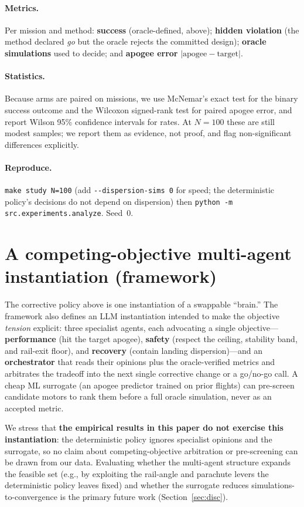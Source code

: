 \documentclass[11pt]{article}
\begin{document}
\paragraph{Metrics.} Per mission and method: \textbf{success} (oracle-defined,
above); \textbf{hidden violation} (the method declared \emph{go} but the oracle
rejects the committed design); \textbf{oracle simulations} used to decide; and
\textbf{apogee error} $|\text{apogee} - \text{target}|$.

\paragraph{Statistics.} Because arms are paired on missions, we use McNemar's
exact test for the binary success outcome and the Wilcoxon signed-rank test for
paired apogee error, and report Wilson 95\% confidence intervals for rates. At
$N = 100$ these are still modest samples; we report them as evidence, not proof,
and flag non-significant differences explicitly.

\paragraph{Reproduce.} \texttt{make study N=100} (add \texttt{-{}-dispersion-sims 0}
for speed; the deterministic policy's decisions do not depend on dispersion) then
\texttt{python -m src.experiments.analyze}. Seed~0.

\section{A competing-objective multi-agent instantiation (framework)}
\label{sec:framework}

The corrective policy above is one instantiation of a swappable ``brain.'' The
framework also defines an LLM instantiation intended to make the objective
\emph{tension} explicit: three specialist agents, each advocating a single
objective---\textbf{performance} (hit the target apogee), \textbf{safety}
(respect the ceiling, stability band, and rail-exit floor), and
\textbf{recovery} (contain landing dispersion)---and an \textbf{orchestrator}
that reads their opinions plus the oracle-verified metrics and arbitrates the
tradeoff into the next single corrective change or a go/no-go call. A cheap ML
surrogate (an apogee predictor trained on prior flights) can pre-screen candidate
motors to rank them before a full oracle simulation, never as an accepted metric.

We stress that \textbf{the empirical results in this paper do not exercise this
instantiation}: the deterministic policy ignores specialist opinions and the
surrogate, so no claim about competing-objective arbitration or pre-screening can
be drawn from our data. Evaluating whether the multi-agent structure expands the
feasible set (e.g., by exploiting the rail-angle and parachute levers the
deterministic policy leaves fixed) and whether the surrogate reduces
simulations-to-convergence is the primary future work (Section~\ref{sec:disc}).
\end{document}
